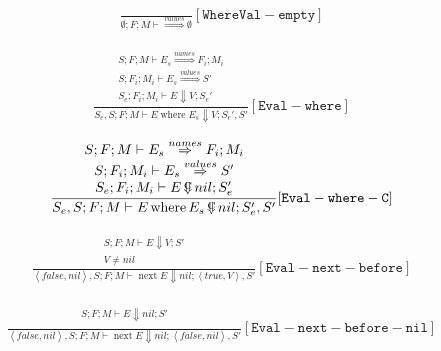 \documentclass{scrartcl}
\DeclareMathOperator{\where}{where}
\DeclareMathOperator{\nextop}{next}
\DeclareMathOperator{\ceval}{\overset{C}{\smash{\Downarrow}}}
\begin{document}
    \begin{align*}
    \frac{}{
        \emptyset; F; M \vdash \overset{values}{\Rightarrow} \emptyset
    }[\mathtt{WhereVal-empty}]
    \end{align*}
    
    \begin{align*}
    \frac{
        \begin{matrix}
        S; F; M \vdash E_s \overset{names}{\Rightarrow} F_i; M_i \\
        S; F_i; M_i \vdash E_s \overset{values}{\Rightarrow} S' \\
        S_e; F_i; M_i \vdash E \Downarrow V; S_e'        
        \end{matrix}
    }{
        S_e, S; F; M \vdash E \where E_s \Downarrow V; S_e', S'
    }[\mathtt{Eval-where}]
    \end{align*}
    
    \begin{align*}
    \frac{
        \begin{matrix}
        S; F; M \vdash E_s \overset{names}{\Rightarrow} F_i; M_i \\
        S; F_i; M_i \vdash E_s \overset{values}{\Rightarrow} S' \\
        S_e; F_i; M_i \vdash E  \ceval nil; S_e'        
        \end{matrix}
    }{
        S_e, S; F; M \vdash E \where E_s \ceval nil; S_e', S'
    }[\mathtt{Eval-where-C}]
    \end{align*}
   
    
    \begin{align*}
    \frac{
        \begin{matrix}
        S; F; M \vdash E \Downarrow V; S' \\
        V \neq nil
        \end{matrix}
    }{
        \left<false, nil \right>, S; F; M \vdash \nextop E \Downarrow nil; \left< true, V \right>, S'
    }[\mathtt{Eval-next-before}]
    \end{align*}
    
    \begin{align*}
    \frac{
        \begin{matrix}
        S; F; M \vdash E \Downarrow nil; S' \\
        \end{matrix}
    }{
        \left<false, nil \right>, S; F; M \vdash \nextop E \Downarrow nil; \left< false, nil \right>, S'
    }[\mathtt{Eval-next-before-nil}]
    \end{align*}
    
\end{document}
